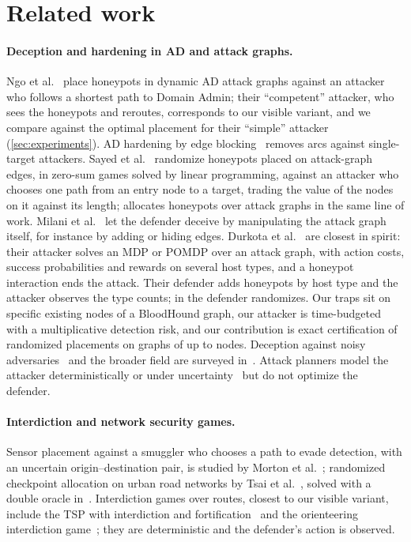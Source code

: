 \documentclass[runningheads]{llncs}
\begin{document}
\section{Related work}\label{sec:related}

\paragraph{Deception and hardening in AD and attack graphs.}
Ngo et al.~\cite{ngo2024catch,ngo2023near} place honeypots in dynamic AD attack graphs against an attacker who follows a shortest path to Domain Admin; their ``competent'' attacker, who sees the honeypots and reroutes, corresponds to our visible variant, and we compare against the optimal placement for their ``simple'' attacker (\cref{sec:experiments}). AD hardening by edge blocking~\cite{guo2022practical,guo2023scalable,goel2022defending} removes arcs against single-target attackers. Sayed et al.~\cite{sayed2023zeroday,sayed2023tactical} randomize honeypots placed on attack-graph edges, in zero-sum games solved by linear programming, against an attacker who chooses one path from an entry node to a target, trading the value of the nodes on it against its length; \cite{anwar2020honeypot} allocates honeypots over attack graphs in the same line of work. Milani et al.~\cite{milani2020harnessing} let the defender deceive by manipulating the attack graph itself, for instance by adding or hiding edges. Durkota et al.~\cite{durkota2015optimal,durkota2015approximate} are closest in spirit: their attacker solves an MDP or POMDP over an attack graph, with action costs, success probabilities and rewards on several host types, and a honeypot interaction ends the attack. Their defender adds honeypots by host type and the attacker observes the type counts; in \cite{durkota2015approximate} the defender randomizes. Our traps sit on specific existing nodes of a BloodHound graph, our attacker is time-budgeted with a multiplicative detection risk, and our contribution is exact certification of randomized placements on graphs of up to \NodesMaxCert{} nodes. Deception against noisy adversaries~\cite{share2018} and the broader field are surveyed in~\cite{pawlick2019taxonomy}. Attack planners model the attacker deterministically or under uncertainty~\cite{sarraute2011optimal,sarraute2012pomdps} but do not optimize the defender.

\paragraph{Interdiction and network security games.}
Sensor placement against a smuggler who chooses a path to evade detection, with an uncertain origin--destination pair, is studied by Morton et al.~\cite{morton2007models}; randomized checkpoint allocation on urban road networks by Tsai et al.~\cite{tsai2010urban}, solved with a double oracle in~\cite{jain2011double}. Interdiction games over routes, closest to our visible variant, include the TSP with interdiction and fortification~\cite{lozano2017tsp} and the orienteering interdiction game~\cite{taninmis2024orienteering}; they are deterministic and the defender's action is observed.
\end{document}
